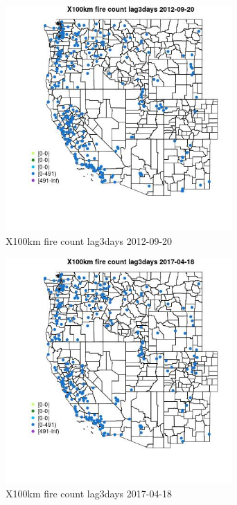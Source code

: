 \begin{figure} 
\centering  
\includegraphics[width=0.77\textwidth]{Code_Outputs/Report_ML_input_PM25_Step4_part_e_de_duplicated_aves_compiled_2019-05-14wNAs_MapObsX100km_fire_count_lag3days2012-09-20.jpg} 
\caption{\label{fig:Report_ML_input_PM25_Step4_part_e_de_duplicated_aves_compiled_2019-05-14wNAsMapObsX100km_fire_count_lag3days2012-09-20}X100km fire count lag3days 2012-09-20} 
\end{figure} 
 

\clearpage 

\begin{figure} 
\centering  
\includegraphics[width=0.77\textwidth]{Code_Outputs/Report_ML_input_PM25_Step4_part_e_de_duplicated_aves_compiled_2019-05-14wNAs_MapObsX100km_fire_count_lag3days2017-04-18.jpg} 
\caption{\label{fig:Report_ML_input_PM25_Step4_part_e_de_duplicated_aves_compiled_2019-05-14wNAsMapObsX100km_fire_count_lag3days2017-04-18}X100km fire count lag3days 2017-04-18} 
\end{figure} 
 


